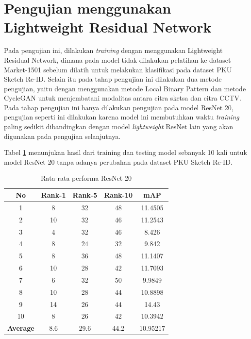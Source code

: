 \section{Pengujian menggunakan Lightweight Residual Network}
\label{sec: nopretrained}
\vspace{1ex}
Pada pengujian ini, dilakukan \textit{training} dengan menggunakan Lightweight Residual Network, dimana pada model tidak dilakukan pelatihan ke dataset Market-1501 sebelum dilatih untuk melakukan klasifikasi pada dataset PKU Sketch Re-ID. Selain itu pada tahap pengujian ini dilakukan dua metode pengujian, yaitu dengan menggunakan metode Local Binary Pattern dan metode CycleGAN untuk menjembatani modalitas antara citra sketsa dan citra CCTV. Pada tahap pengujian ini hanya dilakukan pengujian pada model ResNet 20, pengujian seperti ini dilakukan karena model ini membutuhkan waktu \textit{training} paling sedikit dibandingkan dengan model \textit{lightweight} ResNet lain yang akan digunakan pada pengujian selanjutnya.

Tabel \ref{tabel: 4} menunjukan hasil dari training dan testing model sebanyak 10 kali untuk model ResNet 20 tanpa adanya perubahan pada dataset PKU Sketch Re-ID.

\vspace{1ex}

\begin{longtable}{|c|c|c|c|c|}
	\caption{Rata-rata performa ResNet 20}
	\label{tabel: 4}\\
	\hline
	\rowcolor[HTML]{C0C0C0}
	\textbf{No} &\textbf{Rank-1} & \textbf{Rank-5} & \textbf{Rank-10} & \textbf{mAP} \\
	\hline
	1 & 8 & 32 & 48 & 11.4505\\
	2 & 10 & 32 & 46 & 11.2543\\
	3 & 4 & 32 & 46 & 8.426\\
	4 & 8 & 24 & 32 & 9.842\\
	5 & 8 & 36 & 48 & 11.1407\\
	6 & 10 & 28 & 42 & 11.7093\\
	7 & 6 & 32 & 50 & 9.9849\\
	8 & 10 & 28 & 44 & 10.8898\\
	9 & 14 & 26 & 44 & 14.43\\
	10 & 8 & 26 & 42 & 10.3942\\
	\hline
	\textbf{Average} & 8.6 & 29.6 & 44.2 & 10.95217\\
	\hline
\end{longtable}

\vspace{1ex}

